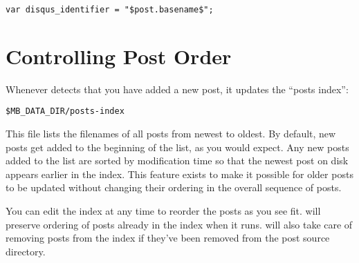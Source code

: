 \documentclass[11pt, letterpaper, oneside, titlepage]{book}
\begin{document}
\begin{verbatim}
var disqus_identifier = "$post.basename$";
\end{verbatim}

\section{Controlling Post Order}
\label{sec:postsindex}

Whenever  detects that you have added a new post, it updates the ``posts
index'':

\begin{verbatim}
$MB_DATA_DIR/posts-index
\end{verbatim}

This file lists the filenames of all posts from newest to oldest.  By default,
new posts get added to the beginning of the list, as you would expect.  Any new
posts added to the list are sorted by modification time so that the newest post
on disk appears earlier in the index.  This feature exists to make it possible
for older posts to be updated without changing their ordering in the overall
sequence of posts.

You can edit the index at any time to reorder the posts as you see fit.
 will preserve ordering of posts already in the index when it runs.
 will also take care of removing posts from the index if they've been
removed from the post source directory.
\end{document}

